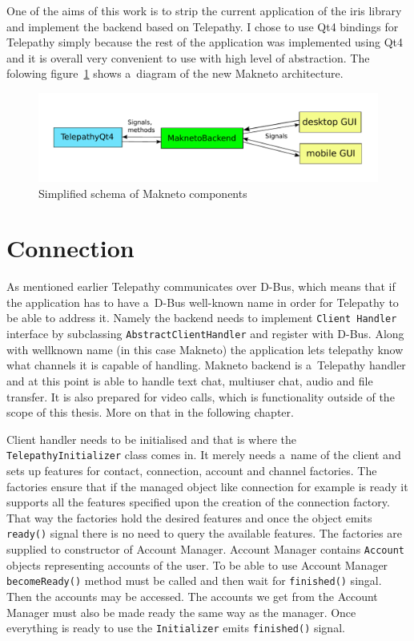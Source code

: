 One of the aims of this work is to strip the current application of the iris library and implement the backend based on Telepathy. I chose to use Qt4 bindings for Telepathy simply because the rest of the application was implemented using Qt4 and it is overall very convenient to use with high level of abstraction.	The folowing figure~\ref{fig:MaknetoArchitectureDiagram} shows a~diagram of the new Makneto architecture. 

\begin{figure}[ht]
	\begin{center}
	\includegraphics[width=15cm]{fig/maknetoArchitecture}
	\caption{Simplified schema of Makneto components}
	\label{fig:MaknetoArchitectureDiagram}
\end{center}
\end{figure}

\section{Connection}
As mentioned earlier Telepathy communicates over D-Bus, which means that if the application has to have a~D-Bus well-known name in order for Telepathy to be able to address it.	Namely the backend needs to implement \verb|Client Handler| interface by subclassing \verb|AbstractClientHandler| and register with D-Bus. Along with wellknown name (in this case Makneto) the application lets telepathy know what channels it is capable of handling. Makneto backend is a~Telepathy handler and at this point is able to handle text chat, multiuser chat, audio and file transfer. It is also prepared for video calls, which is functionality outside of the scope of this thesis. More on that in the following chapter. 

Client handler needs to be initialised and that is where the \verb|TelepathyInitializer| class comes in. It merely needs a~name of the client and sets up features for contact, connection, account and channel factories. The factories ensure that if the managed object like connection for example is ready it supports all the features specified upon the creation of the connection factory. That way the factories hold the desired features and once the object emits \verb|ready()| signal there is no need to query the available features. The factories are supplied to constructor of Account Manager. Account Manager contains \verb|Account| objects representing accounts of the user. To be able to use Account Manager \verb|becomeReady()| method must be called and then wait for \verb|finished()| singal. Then the accounts may be accessed. The accounts we get from the Account Manager must also be made ready the same way as the manager. Once everything is ready to use the \verb|Initializer| emits \verb|finished()| signal. 

